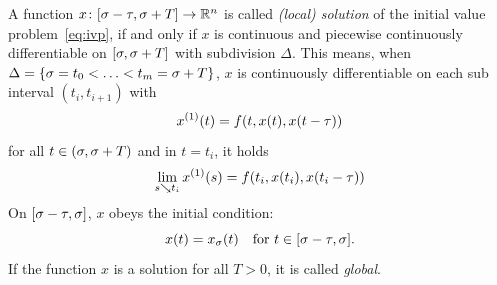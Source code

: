     \begin{definition}\label{def:solution-dde}
        A function $x\colon[\sigma-\tau,\sigma+T]\to\mathbb{R}^n$ is called \emph{(local) solution} of the initial value problem~\eqref{eq:ivp}, if and only if
        $x$ is continuous and piecewise continuously differentiable on $[\sigma,\sigma+T]$ with subdivision $\Delta$.
        This means, when $\Delta=\{\sigma=t_0<\ldots<t_m=\sigma+T\}$, $x$ is continuously differentiable on each sub interval $(t_i,t_{i+1})$
        with
        \begin{equation*}
            \D{x}(t) = f(t,x(t),x(t-\tau))
        \end{equation*}
        for all $t\in (\sigma,\sigma+T)$ and in $t=t_i$, it holds
        \begin{equation*}
            \lim_{s\downto t_i}\D{x}(s)=f(t_i,x(t_i),x(t_i-\tau))
        \end{equation*}
        On $[\sigma-\tau,\sigma]$, $x$ obeys the initial condition:
        \begin{equation*}
            x(t) = x_{\sigma}(t) \quad\text{for } t\in [\sigma-\tau,\sigma].
        \end{equation*}
        If the function $x$ is a solution for all $T>0$, it is called \emph{global}.

    \end{definition}

    


\begin{lemma}
    \label{lemma-continuity}

\end{lemma}

